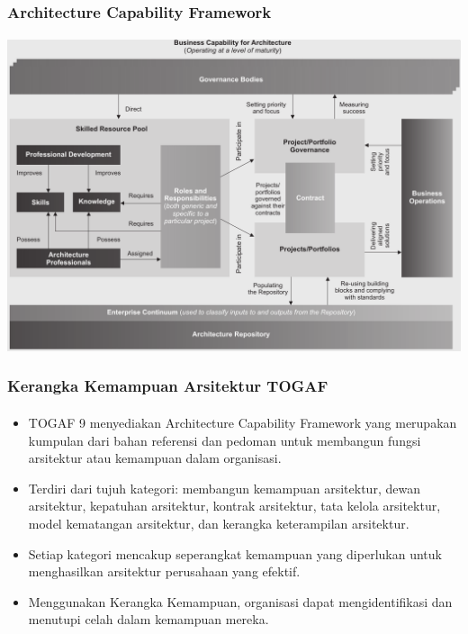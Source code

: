 \documentclass[aspectratio=169, table]{beamer}
\begin{document}
	{
		\begin{frame}
			\frametitle{Architecture Capability Framework}
			\framesubtitle{\hspace{1cm}}
			\begin{center}
				\includegraphics[width=.80\textwidth]{../figures/architecture_capability_framework}
			\end{center}
		\end{frame}
	}
	
	\begin{frame}
		\frametitle{Kerangka Kemampuan Arsitektur TOGAF}
		\framesubtitle{\hspace{1cm}}
		\begin{itemize}
			\item TOGAF 9 menyediakan Architecture Capability Framework yang merupakan kumpulan dari bahan referensi dan pedoman untuk membangun fungsi arsitektur
			atau kemampuan dalam organisasi.
			\item Terdiri dari tujuh kategori: membangun kemampuan arsitektur, dewan arsitektur, kepatuhan arsitektur, kontrak arsitektur, tata kelola arsitektur, model kematangan arsitektur, dan kerangka keterampilan arsitektur.
			\item Setiap kategori mencakup seperangkat kemampuan yang diperlukan untuk menghasilkan arsitektur perusahaan yang efektif.
			\item Menggunakan Kerangka Kemampuan, organisasi dapat mengidentifikasi dan menutupi celah dalam kemampuan mereka.
		\end{itemize}
	\end{frame}
	
\end{document}

